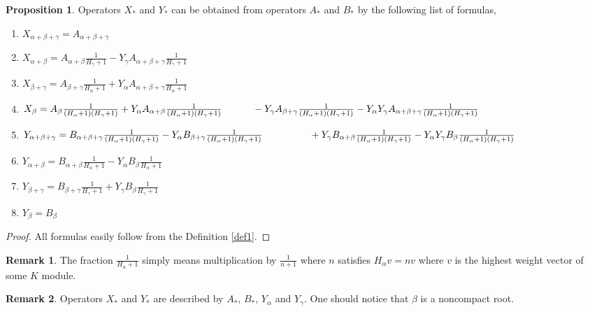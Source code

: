 \documentclass[twoside,a4paper,12pt]{article}
\theoremstyle{definition}
\newtheorem{remark}{Remark}
\newtheorem{proposition}{Proposition}
\begin{document}
\begin{proposition}\label{xyizab}
	Operators $X_*$ and $Y_*$ can be obtained from operators $A_*$ and $B_*$ by
	the following list of formulas,
	\begin{enumerate}
		\item $X_{\alpha+\beta+\gamma}=A_{\alpha+\beta+\gamma}$
		\item $X_{\alpha+\beta}=A_{\alpha+\beta}\frac1{H_\gamma+1}
			-Y_\gamma A_{\alpha+\beta+\gamma}\frac1{H_\gamma+1}$
		\item $X_{\beta+\gamma}=A_{\beta+\gamma}\frac1{H_\alpha+1}
			+Y_\alpha A_{\alpha+\beta+\gamma}\frac1{H_\alpha+1}$
		\item $X_{\beta}=A_{\beta}\frac1{(H_\alpha+1)(H_\gamma+1)}
			+Y_\alpha A_{\alpha+\beta}\frac1{(H_\alpha+1)(H_\gamma+1)}\\
			\hspace*{11mm}-Y_\gamma A_{\beta+\gamma}\frac1{(H_\alpha+1)
			(H_\gamma+1)}-Y_\alpha Y_\gamma A_{\alpha+\beta+\gamma}
			\frac1{(H_\alpha+1)(H_\gamma+1)}$
		\item $Y_{\alpha+\beta+\gamma}=B_{\alpha+\beta+\gamma}
			\frac1{(H_\alpha+1)(H_\gamma+1)}
			-Y_\alpha B_{\beta+\gamma}\frac1{(H_\alpha+1)(H_\gamma+1)}\\
			\hspace*{17mm}+Y_\gamma B_{\alpha+\beta}
			\frac1{(H_\alpha+1)(H_\gamma+1)}
			-Y_\alpha Y_\gamma B_\beta\frac1{(H_\alpha+1)(H_\gamma+1)}$
		\item $Y_{\alpha+\beta}=B_{\alpha+\beta}\frac1{H_\alpha+1}
			-Y_\alpha B_\beta\frac1{H_\alpha+1}$
		\item $Y_{\beta+\gamma}=B_{\beta+\gamma}\frac1{H_\gamma+1}
			+Y_\gamma B_\beta\frac1{H_\gamma+1}$
		\item $Y_\beta=B_\beta$
	\end{enumerate}
\end{proposition}

\begin{proof}
	All formulas easily follow from the Definition \eqref{def1}.
\end{proof}

\begin{remark}
	The fraction $\frac1{H_\alpha+1}$ simply means multiplication by
	$\frac1{n+1}$ where $n$ satisfies $H_\alpha v=nv$ where $v$ is the highest
	weight vector of some $K$ module.
\end{remark}

\begin{remark}
	Operators $X_*$ and $Y_*$ are described by $A_*$, $B_*$, $Y_\alpha$ and
	$Y_\gamma$. One should notice that $\beta$ is a noncompact root.
\end{remark}
\end{document}
